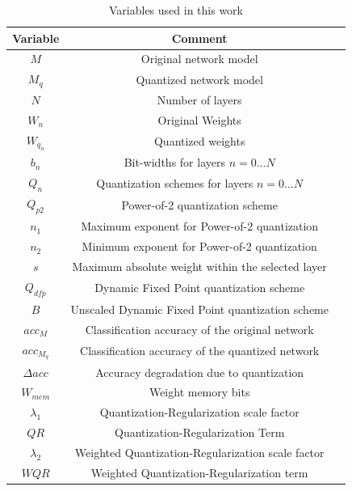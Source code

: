 \begin{table}[ht!]
  \caption{Variables used in this work}
  \label{tab:variables}
  \begin{tabular}{ccl}
    \toprule
    	\textbf{Variable}&\textbf{Comment}\\
    \midrule
 		$M$& Original network model\\
		$M_q$ & Quantized network model\\
 		$N$& Number of layers\\
		$W_n$ & Original Weights\\
		$W_{q_n}$ & Quantized weights\\
		$b_n$ & Bit-widths for layers $n = 0...N$\\
		$Q_n$ & Quantization schemes for layers $n = 0...N$\\
		$Q_{p2}$ & Power-of-2 quantization scheme\\
		$n_1$ & Maximum exponent for Power-of-2 quantization\\
		$n_2$ & Minimum exponent for Power-of-2 quantization\\
		$s$ & Maximum absolute weight within the selected layer\\
		$Q_{dfp}$ & Dynamic Fixed Point quantization scheme\\
		$B$ & Unscaled Dynamic Fixed Point quantization scheme\\
		$acc_M $ & Classification accuracy of the original network\\
		$acc_{M_q} $ & Classification accuracy of the quantized network\\
		$\Delta acc $ & Accuracy degradation due to quantization\\
		$W_{mem} $ & Weight memory bits\\
		$\lambda_1 $ & Quantization-Regularization scale factor\\
		$QR $ & Quantization-Regularization Term\\
		$\lambda_2 $ & Weighted Quantization-Regularization scale factor\\
		$WQR $ & Weighted Quantization-Regularization term\\
  \bottomrule
\end{tabular}
\end{table}


